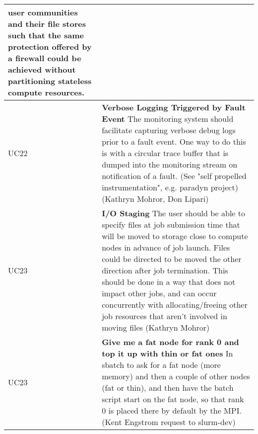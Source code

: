 \begin{longtable}{|p{1cm}|p{15cm}|}
	user communities and their file stores such that the same protection
	offered by a firewall could be achieved without partitioning stateless
	compute resources.\\
  \hline
  UC22 & \textbf{Verbose Logging Triggered by Fault Event}\newline
	The monitoring system should facilitate capturing verbose debug logs
	prior to a fault event. One way to do this is with a circular trace
	buffer that is dumped into the monitoring stream on notification of
	a fault. (See "self propelled instrumentation", e.g. paradyn project)
	(Kathryn Mohror, Don Lipari)\\
  \hline
  UC23 & \textbf{I/O Staging}\newline
	The user should be able to specify files at job submission time that
	will be moved to storage close to compute nodes in advance of job
	launch. Files could be directed to be moved the other direction
	after job termination. This should be done in a way that does not
	impact other jobs, and can occur concurrently with allocating/freeing
	other job resources that aren't involved in moving files (Kathryn
	Mohror)\\
  \hline
  UC23 & \textbf{Give me a fat node for rank 0 and top it up with thin or fat ones}\newline
	In sbatch to ask for a fat node (more memory) and then a couple of
	other nodes (fat or thin), and then have the batch script start on
	the fat node, so that rank 0 is placed there by default by the MPI.
	(Kent Engstrom request to slurm-dev)\\
  \hline
\end{longtable}
